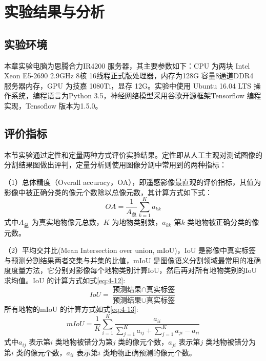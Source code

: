 

\section{实验结果与分析}
\label{sec:third}
\subsection{实验环境}
\label{sec:third-1}
本章实验电脑为思腾合力IR4200 服务器，其主要参数如下：CPU 为两块 Intel Xeon E5-2690 2.9GHz 8核 16线程正式版处理器，内存为128G 容量8通道DDR4 服务器内存，GPU 为技嘉 1080Ti，显存 12G。实验中使用 Ubuntu 16.04 LTS 操作系统，编程语言为Python 3.5，神经网络模型采用谷歌开源框架Tensorflow 编程实现，Tensoflow 版本为1.5.0。

\subsection{评价指标}
\label{sec:third-2}
本节实验通过定性和定量两种方式评价实验结果。定性即从人工主观对测试图像的分割结果图做出评判，定量分析则使用图像分割中常用到的两种指标：

（1）总体精度（Overall accuracy，OA），即遥感影像最直观的评价指标，其值为影像中被正确分类的像元个数除以总像元数，其计算方式如下式：
\begin{equation}
  \label{eq:4-11}
  OA = \frac{1}{A_{\mbox{总}}}  \sum_{k=1}^K a_{kk}
\end{equation}
式中$A_{\mbox{总}}$ 为真实地物像元总数，$K$ 为地物类别数，$a_{kk}$ 第$k$ 类地物被正确分类的像元数。

（2）平均交并比(Mean Intersection over union, mIoU)，IoU 是影像中真实标签与预测分割结果两者交集与并集的比值，mIoU 是图像语义分割领域最常用的准确度度量方法，它分别对影像每个地物类别计算IoU，然后再对所有地物类别的IoU 求均值。IoU 的计算方式如式\ref{eq:4-12}:
\begin{equation}
  \label{eq:4-12}
  IoU = \frac{\mbox{预测结果} \cap \mbox{真实标签}}{\mbox{预测结果} \cup \mbox{真实标签}} 
\end{equation}
所有地物的mIoU 的计算方式如式\ref{eq:4-13}:
\begin{equation}
  \label{eq:4-13}
  mIoU = \frac{1}{K}  \sum_{i=1}^K \frac{a_{ii}}{\sum_{j=1}^Ka_{ij} + \sum_{j=1}^Ka_{ji} -a_{ii}}
\end{equation}
式中$a_{ij}$ 表示第$i$ 类地物被错分为第$j$ 类的像元个数，$a_{ji} $ 表示第$j$ 类地物被错分为第$i$ 类的像元个数，$a_{ii}$ 表示第$i$ 类地物正确预测的像元个数。


